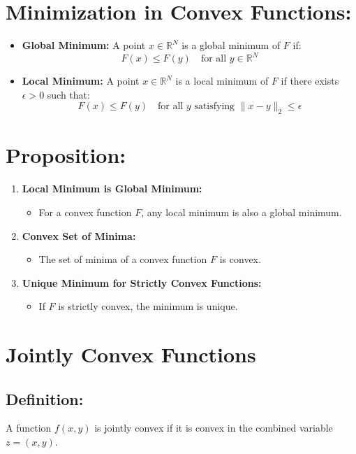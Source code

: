 \documentclass{article}
\begin{document}
\section*{Minimization in Convex Functions:}

\begin{itemize}
    \item \textbf{Global Minimum:} A point \( x \in \mathbb{R}^N \) is a global minimum of \( F \) if:
    \[
    F(x) \leq F(y) \quad \text{for all } y \in \mathbb{R}^N
    \]
    \item \textbf{Local Minimum:} A point \( x \in \mathbb{R}^N \) is a local minimum of \( F \) if there exists \( \epsilon > 0 \) such that:
    \[
    F(x) \leq F(y) \quad \text{for all } y \text{ satisfying } \| x - y \|_2 \leq \epsilon
    \]
\end{itemize}

\section*{Proposition:}

\begin{enumerate}
    \item \textbf{Local Minimum is Global Minimum:}
    \begin{itemize}
        \item For a convex function \( F \), any local minimum is also a global minimum.
    \end{itemize}
    \item \textbf{Convex Set of Minima:}
    \begin{itemize}
        \item The set of minima of a convex function \( F \) is convex.
    \end{itemize}
    \item \textbf{Unique Minimum for Strictly Convex Functions:}
    \begin{itemize}
        \item If \( F \) is strictly convex, the minimum is unique.
    \end{itemize}
\end{enumerate}




\section*{Jointly Convex Functions}

\subsection*{Definition:}
A function \( f(x, y) \) is jointly convex if it is convex in the combined variable \( z = (x, y) \).
\end{document}
